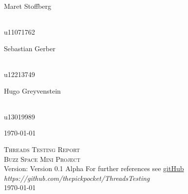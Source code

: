 \documentclass[a4paper,12pt]{report}
\begin{document}
\begin{titlepage}
\begin{center}
\begin{minipage}{0.4\textwidth}
\end{minipage}
\begin{minipage}{0.4\textwidth}
\begin{flushleft} \large
Maret {Stoffberg}
\end{flushleft}
\end{minipage}
\begin{minipage}{0.4\textwidth}
\begin{flushright} \large
\emph{} \\
u11071762
\end{flushright}
\end{minipage}
\begin{minipage}{0.4\textwidth}
\begin{flushleft} \large
Sebastian {Gerber}
\end{flushleft}
\end{minipage}
\begin{minipage}{0.4\textwidth}
\begin{flushright} \large
\emph{} \\
u12213749
\end{flushright}
\end{minipage}
\begin{minipage}{0.4\textwidth}
\begin{flushleft} \large
Hugo {Greyvenstein}
\end{flushleft}
\end{minipage}
\begin{minipage}{0.4\textwidth}
\begin{flushright} \large
\emph{} \\
u13019989
\end{flushright}
\end{minipage}
\vfill
{\large \today}
\end{center}
\end{titlepage}
%

\renewcommand{\thesection}{\arabic{section}}
\newpage
\begin{center}
\textsc{\LARGE Threads Testing Report}\\[1.5cm]
\textsc{\Large Buzz Space Mini Project}\\[0.5cm]
Version: Version 0.1 Alpha 
For further references see \href{https://github.com/thepickpocket/ThreadsTesting}{gitHub} \\
\emph{https://github.com/thepickpocket/ThreadsTesting} \\
\today
\end{center}
\end{document}
